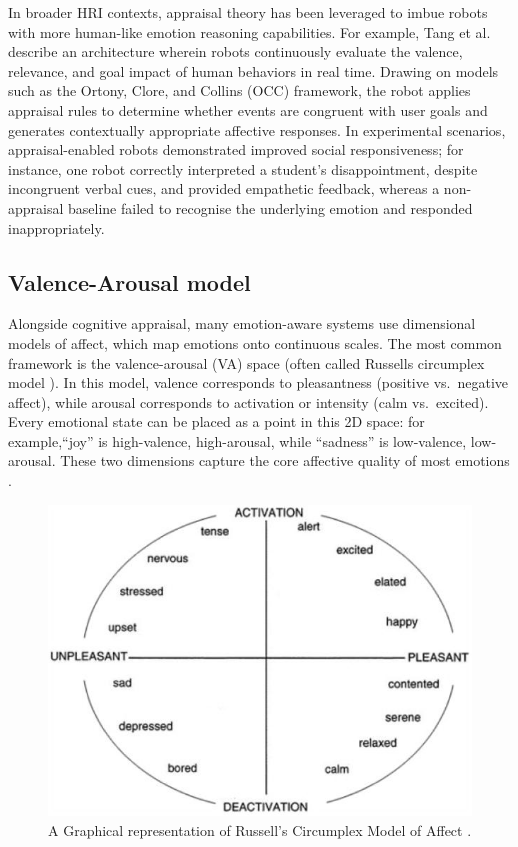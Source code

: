 In broader HRI contexts, appraisal theory has been leveraged to imbue robots with more human-like emotion reasoning capabilities. For example, Tang et al.\ \cite{Tang2025-ny} describe an architecture wherein robots continuously evaluate the valence, relevance, and goal impact of human behaviors in real time. Drawing on models such as the Ortony, Clore, and Collins (OCC) framework, the robot applies appraisal rules to determine whether events are congruent with user goals and generates contextually appropriate affective responses. In experimental scenarios, appraisal-enabled robots demonstrated improved social responsiveness; for instance, one robot correctly interpreted a student's disappointment, despite incongruent verbal cues, and provided empathetic feedback, whereas a non-appraisal baseline failed to recognise the underlying emotion and responded inappropriately.

\subsection{Valence-Arousal model}

Alongside cognitive appraisal, many emotion-aware systems use dimensional models of affect, which map emotions onto continuous scales. The most common framework is the valence-arousal (VA) space (often called Russells circumplex model \cite{Russell1980-cd}). In this model, valence corresponds to pleasantness (positive vs.\ negative affect), while arousal corresponds to activation or intensity (calm vs.\ excited). Every emotional state can be placed as a point in this 2D space: for example,``joy'' is high-valence, high-arousal, while ``sadness'' is low-valence, low-arousal. These two dimensions capture the core affective quality of most emotions \cite{Marmpena2018-tw}.

\begin{figure}[!htb]
    \centering{}
    \includegraphics[scale=0.80]{lit_review_images/RussellsCircumplex.jpg}
    \caption{A Graphical representation of Russell's Circumplex Model of Affect \cite{Russell1980-cd}.}
    \label{fig:RussellsCircumplex}
\end{figure}

